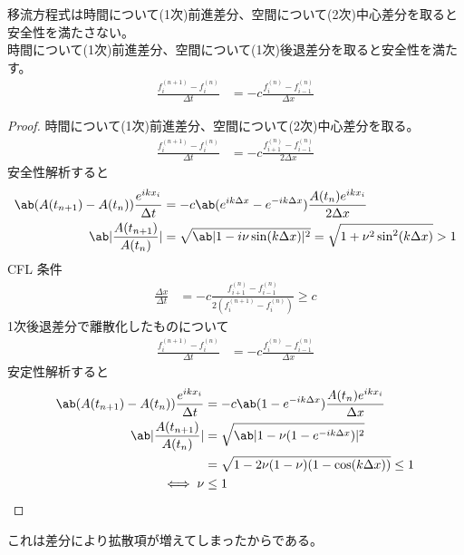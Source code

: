 \documentclass[uplatex,diffipdfmx,a4paper,11pt]{jlreq}
\begin{document}
\begin{theorem}
  移流方程式は時間について(1次)前進差分、空間について(2次)中心差分を取ると安全性を満たさない。 \\
  時間について(1次)前進差分、空間について(1次)後退差分を取ると安全性を満たす。
  \begin{align}
    \frac{f_i^{(n+1)} - f_i^{(n)}}{\Delta t} & = - c\frac{f_i^{(n)} - f_{i-1}^{(n)}}{\Delta x}
  \end{align}
\end{theorem}
\begin{proof}
  時間について(1次)前進差分、空間について(2次)中心差分を取る。
  \begin{align}
    \frac{f_i^{(n+1)} - f_i^{(n)}}{\Delta t} & = -c\frac{f_{i+1}^{(n)} - f_{i-1}^{(n)}}{2\Delta x}
  \end{align}
  安全性解析すると
  \begin{align}
    \ab(A(t_{n+1}) - A(t_n))\frac{e^{ikx_i}}{\Delta t} & = -c\ab(e^{ik\Delta x} - e^{-ik\Delta x})\frac{A(t_n)e^{ikx_i}}{2\Delta x}      \\
    \ab|\frac{A(t_{n+1})}{A(t_n)}|                     & = \sqrt{\ab|1 - i\nu\sin(k\Delta x)|^2} = \sqrt{1 + \nu^2\sin^2(k\Delta x)} > 1
  \end{align}
  CFL 条件
  \begin{align}
    \frac{\Delta x}{\Delta t} & = -c\frac{f_{i+1}^{(n)} - f_{i-1}^{(n)}}{2(f_i^{(n+1)} - f_i^{(n)})} \geq c
  \end{align}
  1次後退差分で離散化したものについて
  \begin{align}
    \frac{f_i^{(n+1)} - f_i^{(n)}}{\Delta t} & = -c\frac{f_i^{(n)} - f_{i-1}^{(n)}}{\Delta x}
  \end{align}
  安定性解析すると
  \begin{align}
    \ab(A(t_{n+1}) - A(t_n))\frac{e^{ikx_i}}{\Delta t} & = -c\ab(1 - e^{-ik\Delta x})\frac{A(t_n)e^{ikx_i}}{\Delta x} \\
    \ab|\frac{A(t_{n+1})}{A(t_n)}|                     & = \sqrt{\ab|1 - \nu(1 - e^{-ik\Delta x})|^2}                 \\
                                                       & = \sqrt{1 - 2\nu(1 - \nu)(1 - \cos(k\Delta x))} \leq 1       \\
    \iff \nu                                           & \leq 1
  \end{align}
\end{proof}
これは差分により拡散項が増えてしまったからである。
\end{document}
